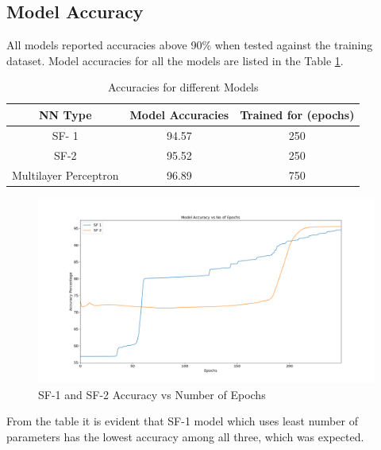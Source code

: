 \documentclass[12pt]{article}
\theoremstyle{definition}
\begin{document}
		\subsection{Model Accuracy}
		All models reported accuracies above 90\% when tested against the training dataset. Model accuracies for all the models are listed in the Table \ref{result:model-accu}.
		\begin{table}[!h]
			\centering
			\caption{Accuracies for different Models}
			\label{result:model-accu}
			\begin{tabular}{|c|c|c|}
				\hline
				\textbf{NN Type}      & \textbf{Model Accuracies} & \textbf{Trained for (epochs)} \\ \hline
				SF- 1                 & 94.57                     & 250                  \\ \hline
				SF-2                  & 95.52                     & 250                  \\ \hline
				Multilayer Perceptron & 96.89                     & 750                  \\ \hline
			\end{tabular}
		\end{table}
		\begin{figure}[!h]
			\centering
			\includegraphics[width=450pt]{pictures/model_1_2_accuracies.png}
			\caption{SF-1 and SF-2 Accuracy vs Number of Epochs}
			\label{fig:sf12-accu}
		\end{figure}
		
		From the table it is evident that SF-1 model which uses least number of parameters has the lowest accuracy among all three, which was expected.
		
\end{document}
